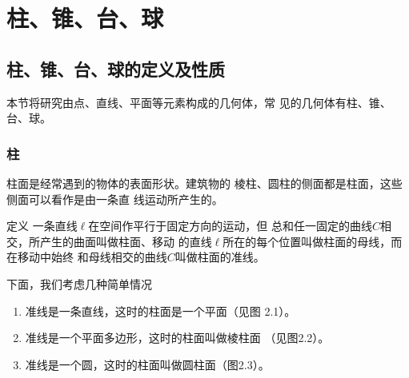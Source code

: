 \chapter{柱、锥、台、球}

\section{柱、锥、台、球的定义及性质}
本节将研究由点、直线、平面等元素构成的几何体，常
见的几何体有柱、锥、台、球。

\subsection{柱}

柱面是经常遇到的物体的表面形状。建筑物的
棱柱、圆柱的侧面都是柱面，这些侧面可以看作是由一条直
线运动所产生的。

\begin{blk}{定义}
    一条直线$\ell$在空间作平行于固定方向的运动，但
总和任一固定的曲线$C$相交，所产生的曲面叫做柱面、移动
的直线$\ell$所在的每个位置叫做柱面的母线，而在移动中始终
和母线相交的曲线$C$叫做柱面的准线。
\end{blk}

下面，我们考虑几种简单情况
\begin{enumerate}
\item 准线是一条直线，这时的柱面是一个平面（见图
2.1）。
\item 准线是一个平面多边形，这时的柱面叫做棱柱面
（见图2.2）。
\item 准线是一个圆，这时的柱面叫做圆柱面（图2.3）。
\end{enumerate}

